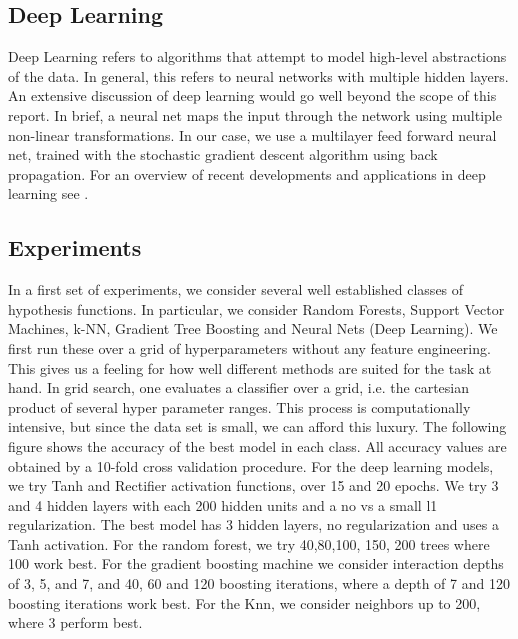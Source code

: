 \documentclass[paper=a4, fontsize=11pt]{scrartcl}
\numberwithin{equation}{section}
\numberwithin{figure}{section}
\numberwithin{table}{section}
\begin{document}
\subsection{Deep Learning}
Deep Learning refers to algorithms that attempt to model high-level abstractions of the data. In general, this refers to neural networks with multiple hidden layers. An extensive discussion of deep learning would go well beyond the scope of this report. In brief, a neural net maps the input through the network using multiple non-linear transformations. In our case, we use a multilayer feed forward neural net, trained with the stochastic gradient descent algorithm using back propagation.
For an overview of recent developments and applications in deep learning see \cite{deeplearning}.


\subsection{Experiments}

In a first set of experiments, we consider several well established classes of hypothesis functions. In particular, we consider Random Forests, Support Vector Machines, k-NN,  Gradient Tree Boosting and Neural Nets (Deep Learning). 
We first run these over a grid of hyperparameters without any feature engineering. This gives us a feeling for how well different methods are suited for the task at hand. In grid search, one evaluates a classifier over a grid, i.e. the cartesian product of several hyper parameter ranges. This process is computationally intensive, but since the data set is small, we can afford this luxury. The following figure shows the accuracy of the best model in each class. All accuracy values are obtained by a 10-fold cross validation procedure. 
For the deep learning models, we try Tanh and Rectifier activation functions, over 15 and 20 epochs. We try 3 and 4 hidden layers with each 200 hidden units and a no vs a small l1 regularization. The best model has 3 hidden layers, no regularization and uses a Tanh activation. For the random forest, we try 40,80,100, 150, 200 trees where 100 work best. For the gradient boosting machine we consider interaction depths of 3, 5, and 7, and 40, 60 and 120 boosting iterations, where a depth of 7 and 120 boosting iterations work best. For the Knn, we consider neighbors up to 200, where 3 perform best. 
\end{document}
